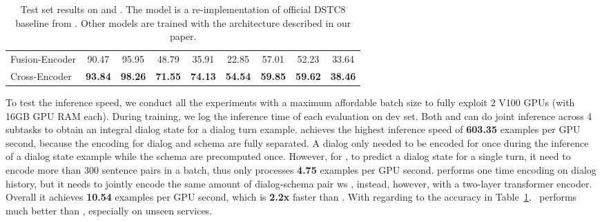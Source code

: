 \begin{table}[!t]
\begin{center}
{\begin{tabular}{l|ccccc|ccc}
  Fusion-Encoder               & 90.47                      & 95.95       & 48.79                          & 35.91       & 22.85       & 57.01       & 52.23       & 33.64       \\
  Cross-Encoder                & {\bf 93.84}                & {\bf 98.26} & {\bf 71.55}                    & {\bf 74.13} & {\bf 54.54} & {\bf 59.85} & {\bf 59.62} & {\bf 38.46} \\ \hline
  \bottomrule
\end{tabular}}
\end{center}
\caption{\label{tbl:sgd-modeling-results} Test set results on \sgdst and \multiwoz. The
  \DE model is a re-implementation of official DSTC8
  baseline from \citet{rastogi2019towards}. Other models are
  trained with the architecture described in our paper.}
\end{table}

 To test the inference speed, we conduct
all the experiments with a maximum affordable batch size to fully
exploit 2 V100 GPUs (with 16GB GPU RAM each). During training, we log
the inference time of each evaluation on dev set. Both \DE and \FE can
do joint inference across 4 subtasks to obtain an integral dialog
state for a dialog turn example. \DE achieves the highest inference
speed of {\bf 603.35} examples per GPU second, because the encoding
for dialog and schema are fully separated. A dialog only needed to be
encoded for once during the inference of a dialog state example while
the schema are precomputed once. However, for \CE, to predict a dialog
state for a single turn, it need to encode more than 300 sentence
pairs in a batch, thus only processes {\bf 4.75} examples per GPU
second. \FE performs one time encoding on dialog history, but it needs
to jointly encode the same amount of dialog-schema pair ws \CE,
instead, however, with a two-layer transformer encoder. Overall it
achieves {\bf 10.54} examples per GPU second, which is {\bf 2.2x}
faster than \CE. With regarding to the accuracy in
Table~\ref{tbl:sgd-modeling-results}, \FE~performs much better than
\DE, especially on unseen services.

